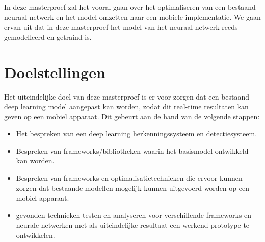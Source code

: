 In deze masterproef zal het vooral gaan over het optimaliseren van een bestaand neuraal netwerk en het model omzetten naar een mobiele implementatie.
We gaan ervan uit dat in deze masterproef het model van het neuraal netwerk reeds gemodelleerd en getraind is.


\section{Doelstellingen}
Het uiteindelijke doel van deze masterproef is er voor zorgen dat een bestaand deep learning model aangepast kan worden, zodat dit real-time resultaten kan geven op een mobiel apparaat. 
Dit gebeurt aan de hand van de volgende stappen:
\begin{itemize}
    \item Het bespreken van een deep learning herkenningssysteem en detectiesysteem.
    \item Bespreken van frameworks/bibliotheken waarin het basismodel ontwikkeld kan worden.
    \item Bespreken van frameworks en optimalisatietechnieken die ervoor kunnen zorgen dat bestaande modellen mogelijk kunnen uitgevoerd worden op een mobiel apparaat.
    \item gevonden technieken testen en analyseren voor verschillende frameworks en neurale netwerken met als uiteindelijke resultaat een werkend prototype te ontwikkelen.
\end{itemize}